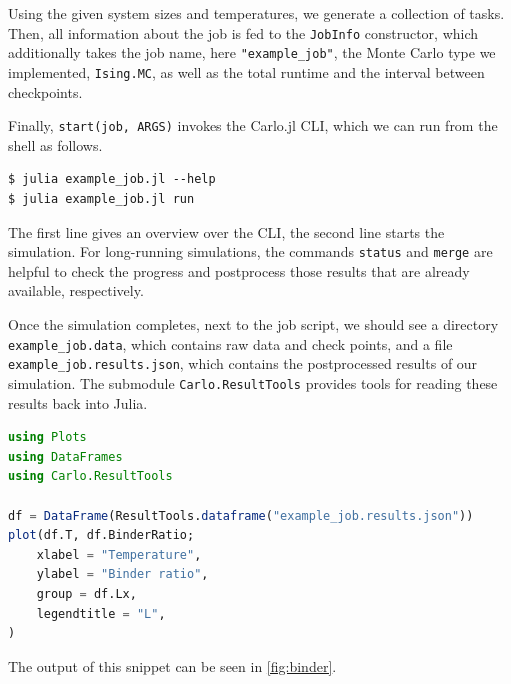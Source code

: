 \documentclass{SciPost}
\begin{document}
Using the given system sizes and temperatures, we generate a collection of tasks. Then, all information about the job is fed to the \texttt{JobInfo} constructor, which additionally takes the job name, here \texttt{"example\_{}job"}, the Monte Carlo type we implemented, \texttt{Ising.MC}, as well as the total runtime and the interval between checkpoints.

Finally, \texttt{start(job, ARGS)} invokes the Carlo.jl CLI, which we can run from the shell as follows.
\begin{lstlisting}
$ julia example_job.jl --help
$ julia example_job.jl run
\end{lstlisting}
The first line gives an overview over the CLI, the second line starts the simulation.
For long-running simulations, the commands \texttt{status} and \texttt{merge} are helpful to check the progress and postprocess those results that are already available, respectively.

Once the simulation completes, next to the job script, we should see a directory \texttt{example\_{}job.data}, which contains raw data and check points, and a file \texttt{example\_{}job.results.json}, which contains the postprocessed results of our simulation. The submodule \texttt{Carlo.ResultTools} provides tools for reading these results back into Julia.
\begin{lstlisting}[language=julia]
using Plots
using DataFrames
using Carlo.ResultTools

df = DataFrame(ResultTools.dataframe("example_job.results.json"))
plot(df.T, df.BinderRatio;
    xlabel = "Temperature",
    ylabel = "Binder ratio",
    group = df.Lx,
    legendtitle = "L",
)
\end{lstlisting}
The output of this snippet can be seen in \cref{fig:binder}.
\end{document}
